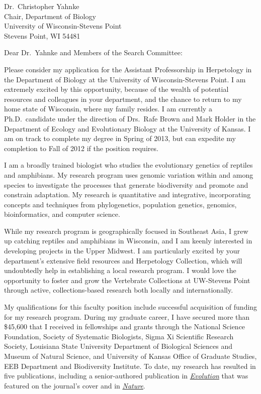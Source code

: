 \documentclass[letterpaper, 10pt]{letter}
\begin{document}
\begin{letter}{Dr.\ Christopher Yahnke \\
                     Chair, Department of Biology \\
                     University of Wisconsin-Stevens Point \\
                     Stevens Point, WI  54481}
\opening{Dear Dr.\ Yahnke and Members of the Search Committee:}
\raggedright
Please consider my application for the Assistant Professorship in Herpetology
in the Department of Biology at the University of Wisconsin-Stevens Point.
I am extremely excited by this opportunity, because of the wealth of potential
resources and colleagues in your department, and the chance to return to my
home state of Wisconsin, where my family resides.
I am currently a Ph.D.\ candidate under the direction of Drs.\ Rafe Brown and
Mark Holder in the Department of Ecology and Evolutionary Biology at the
University of Kansas.
I am on track to complete my degree in Spring of 2013, but can expedite my
completion to Fall of 2012 if the position requires.

I am a broadly trained biologist who studies the evolutionary genetics of
reptiles and amphibians.
My research program uses genomic variation within and among species to
investigate the processes that generate biodiversity and promote and constrain
adaptation.
My research is quantitative and integrative, incorporating concepts and
techniques from phylogenetics, population genetics, genomics, bioinformatics,
and computer science.

While my research program is geographically focused in Southeast Asia, I grew
up catching reptiles and amphibians in Wisconsin, and I am keenly interested in
developing projects in the Upper Midwest.
I am particularly excited by your department's extensive field resources and
Herpetology Collection, which will undoubtedly help in establishing a local
research program.
I would love the opportunity to foster and grow the Vertebrate Collections at
UW-Stevens Point through active, collections-based research both locally and
internationally.

My qualifications for this faculty position include successful acquisition of
funding for my research program.
During my graduate career, I have secured more than \$45,600 that I received in
fellowships and grants through the 
National Science Foundation,
Society of Systematic Biologists,
Sigma Xi Scientific Research Society,
Louisiana State University Department of Biological Sciences and Museum of
Natural Science,
and University of Kansas Office of Graduate Studies, EEB Department and
Biodiversity Institute.
To date, my research has resulted in five publications, including a
senior-authored publication in
\href{http://onlinelibrary.wiley.com/doi/10.1111/j.1558-5646.2011.01373.x/abstract}{\it
Evolution} that was featured on the journal's cover and in
\href{http://www.nature.com/nature/journal/v474/n7353/full/474545a.html}{\it
Nature}. 


\end{letter}
\end{document}

